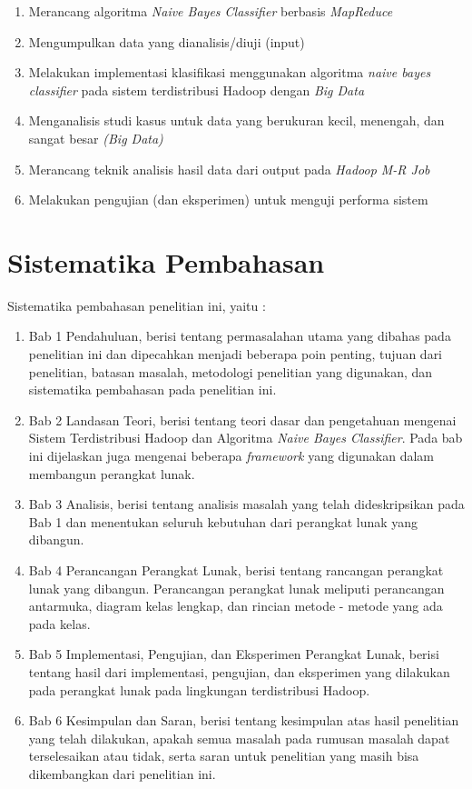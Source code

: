 \begin{enumerate}
		\item Merancang algoritma \textit{Naive Bayes Classifier} berbasis \textit{MapReduce} 
		\item Mengumpulkan data yang dianalisis/diuji (input)
		\item Melakukan implementasi klasifikasi menggunakan algoritma \textit{naive bayes classifier} pada sistem terdistribusi Hadoop dengan \textit{Big Data}
		\item Menganalisis studi kasus untuk data yang berukuran kecil, menengah, dan sangat besar \textit{(Big Data)}
		\item Merancang teknik analisis hasil data dari output pada {\it Hadoop M-R Job}
		\item Melakukan pengujian (dan eksperimen) untuk menguji performa sistem
\end{enumerate}


\section{Sistematika Pembahasan}

Sistematika pembahasan penelitian ini, yaitu :

\begin{enumerate}
	\item Bab 1 Pendahuluan, berisi tentang permasalahan utama yang dibahas pada penelitian ini dan dipecahkan menjadi beberapa poin penting, tujuan dari penelitian, batasan masalah, metodologi penelitian yang digunakan, dan sistematika pembahasan pada penelitian ini. 
	\item Bab 2 Landasan Teori, berisi tentang teori dasar dan pengetahuan mengenai Sistem Terdistribusi Hadoop dan Algoritma \textit{Naive Bayes Classifier}. Pada bab ini dijelaskan juga mengenai beberapa \textit{framework} yang digunakan dalam membangun perangkat lunak.
	\item Bab 3 Analisis, berisi tentang analisis masalah yang telah dideskripsikan pada Bab 1 dan menentukan seluruh kebutuhan dari perangkat lunak yang dibangun.
	\item Bab 4 Perancangan Perangkat Lunak, berisi tentang rancangan perangkat lunak yang dibangun. Perancangan perangkat lunak meliputi perancangan antarmuka, diagram kelas lengkap, dan rincian metode - metode yang ada pada kelas.
	\item Bab 5 Implementasi, Pengujian, dan Eksperimen Perangkat Lunak, berisi tentang hasil dari implementasi, pengujian, dan eksperimen yang dilakukan pada perangkat lunak pada lingkungan terdistribusi Hadoop.
	\item Bab 6 Kesimpulan dan Saran, berisi tentang kesimpulan atas hasil penelitian yang telah dilakukan, apakah semua masalah pada rumusan masalah dapat terselesaikan atau tidak, serta saran untuk penelitian yang masih bisa dikembangkan dari penelitian ini.
\end{enumerate}
